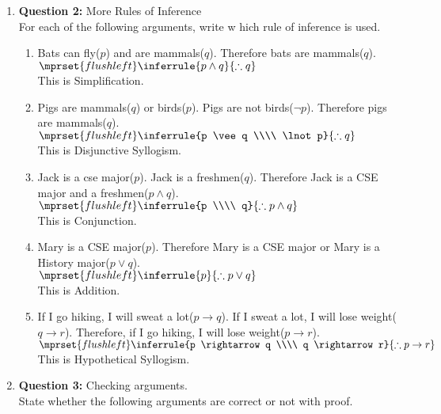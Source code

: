 \documentclass[11pt]{article}
\begin{document}
\begin{enumerate}
\item 
\textbf{Question 2:} More Rules of Inference \\
For each of the following arguments, write w hich rule of inference is used.
\begin{enumerate}[label=(\alph*)]
\item 
Bats can fly($p$) and are mammals($q$). Therefore bats are mammals($q$). \\
$
\mprset{flushleft}
\inferrule
    {p \wedge q}
    {\therefore q}
$\\
This is Simplification.
\item 
Pigs are mammals($q$) or birds($p$). Pigs are not birds($\lnot p$). Therefore pigs are mammals($q$).\\ 
$
\mprset{flushleft}
\inferrule
    {p \vee q \\\\ \lnot p}
    {\therefore q}
$\\
This is Disjunctive Syllogism.
\item 
Jack is a cse major($p$). Jack is a freshmen($q$). Therefore Jack is a CSE major and a freshmen($p \wedge q$).\\
$
\mprset{flushleft}
\inferrule
    {p \\\\ q}
    {\therefore p \wedge q}
$\\
This is Conjunction.
\item
Mary is a CSE major($p$). Therefore Mary is a CSE major or Mary is a History major($p \vee q$).\\
$
\mprset{flushleft}
\inferrule
    {p}
    {\therefore p \vee q}
$\\
This is Addition.
\item 
If I go hiking, I will sweat a lot($p \rightarrow q$). If I sweat a lot, I will lose weight($q \rightarrow r$). Therefore, if I go hiking, I will lose weight($p \rightarrow r$).\\
$
\mprset{flushleft}
\inferrule
    {p \rightarrow q \\\\ q \rightarrow r}
    {\therefore p \rightarrow r}
$\\
This is Hypothetical Syllogism.
\end{enumerate}
\item
\textbf{Question 3:} Checking arguments. \\
State whether the following arguments are correct or not with proof.
\begin{enumerate}[label=(\alph*)]

\end{enumerate}
\end{enumerate}
\end{document}
